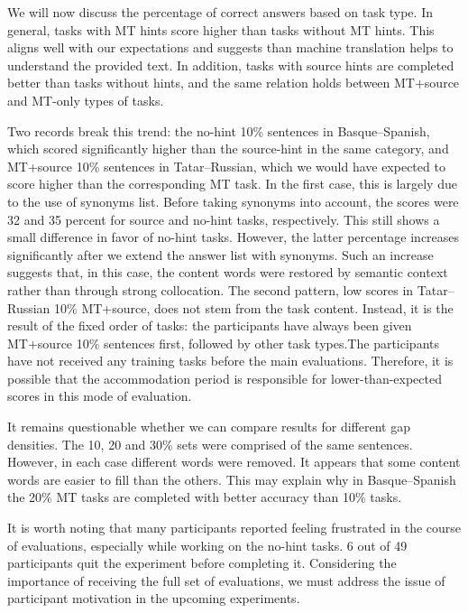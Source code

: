 \documentclass[11pt]{article}
\newcommand{\comment}[1]{}
\begin{document}
We will now discuss the percentage of correct answers based on task type. In general, tasks with MT hints score higher than tasks without MT hints. This aligns well with our expectations and suggests than machine translation helps to understand the provided text. In addition, tasks with source hints are completed better than tasks without hints, and the same relation holds between MT+source and MT-only types of tasks. 

Two records break this trend: the no-hint 10\% sentences in Basque--Spanish, which scored significantly higher than the source-hint in the same category, and MT+source 10\% sentences in Tatar--Russian, which we would have expected to score higher than the corresponding MT task. In the first case, this is largely due to the use of synonyms list. Before taking synonyms into account, the scores were 32 and 35 percent for source and no-hint tasks, respectively. This still shows a small difference in favor of no-hint tasks. However, the latter percentage increases significantly after we extend the answer list with synonyms. Such an increase suggests that, in this case, the content words were restored by 
semantic context rather than through strong collocation. The second pattern, low scores in Tatar--Russian 10\% MT+source, does not stem from the task content. Instead, it is the result of the fixed order of tasks: the participants have always been given MT+source 10\% sentences first, followed by other task types.\comment{MLF: Why? Not random? \cite{oregan13} did random! Why was this changed?}The participants have not received any training tasks before the main evaluations. Therefore, it is possible that the accommodation period is responsible for lower-than-expected scores in this mode of evaluation. 

It remains questionable whether we can compare results for different gap densities. The 10, 20 and 30\% sets were comprised
of the same sentences. However, in each case different words were removed. It appears
that some content words are easier to fill than the others. This may explain why in
Basque--Spanish the 20\% MT tasks are completed with better accuracy than 10\% tasks.\comment{MLF: I think this shows that our statistics are weak, should we say something to excuse ourselves?}

It is worth noting that many participants reported feeling frustrated in
the course of evaluations, especially while working on the no-hint tasks. 6 out of 49
participants quit the experiment before completing it. Considering the importance of receiving the full set of evaluations, we must address the issue of participant motivation in the upcoming experiments.
\end{document}
